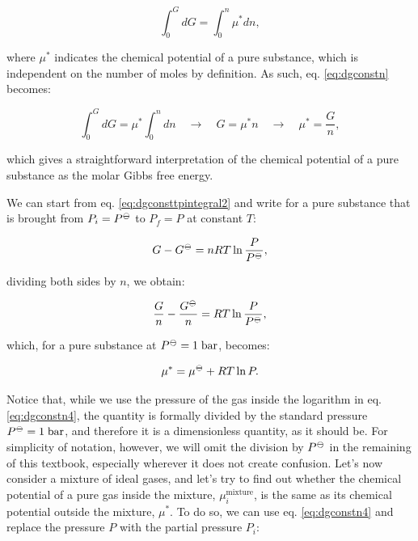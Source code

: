 \documentclass[
]{book}
\theoremstyle{definition}
\theoremstyle{definition}
\theoremstyle{definition}
\theoremstyle{remark}
\begin{document}
\begin{equation}
\int_0^G d G = \int_0^n \mu^* dn,
\label{eq:dgconstn}
\end{equation}

where \(\mu^*\) indicates the chemical potential of a pure substance, which is independent on the number of moles by definition. As such, eq. \eqref{eq:dgconstn} becomes:

\begin{equation}
\int_0^G d G = \mu^* \int_0^n dn \quad \rightarrow \quad G = \mu^* n \quad \rightarrow \quad \mu^* = \frac{G}{n},
\label{eq:dgconstn1}
\end{equation}

which gives a straightforward interpretation of the chemical potential of a pure substance as the molar Gibbs free energy.

We can start from eq. \eqref{eq:dgconsttpintegral2} and write for a pure substance that is brought from \(P_i=P^{-\kern-6pt{\ominus}\kern-6pt-}\) to \(P_f=P\) at constant \(T\):

\begin{equation}
G - G^{-\kern-6pt{\ominus}\kern-6pt-}= nRT \ln \frac{P}{P^{-\kern-6pt{\ominus}\kern-6pt-}},
\label{eq:dgconstn2}
\end{equation}

dividing both sides by \(n\), we obtain:

\begin{equation}
\frac{G}{n} - \frac{G^{-\kern-6pt{\ominus}\kern-6pt-}}{n} = RT \ln \frac{P}{P^{-\kern-6pt{\ominus}\kern-6pt-}},
\label{eq:dgconstn3}
\end{equation}

which, for a pure substance at \(P^{-\kern-6pt{\ominus}\kern-6pt-}= 1 \;\text{bar}\), becomes:

\begin{equation}
\mu^* = \mu^{-\kern-6pt{\ominus}\kern-6pt-}+ RT \ln P.
\label{eq:dgconstn4}
\end{equation}

Notice that, while we use the pressure of the gas inside the logarithm in eq. \eqref{eq:dgconstn4}, the quantity is formally divided by the standard pressure \(P^{-\kern-6pt{\ominus}\kern-6pt-}= 1 \;\text{bar}\), and therefore it is a dimensionless quantity, as it should be. For simplicity of notation, however, we will omit the division by \(P^{-\kern-6pt{\ominus}\kern-6pt-}\) in the remaining of this textbook, especially wherever it does not create confusion.
Let's now consider a mixture of ideal gases, and let's try to find out whether the chemical potential of a pure gas inside the mixture, \(\mu_i^{\text{mixture}}\), is the same as its chemical potential outside the mixture, \(\mu^*\).
To do so, we can use eq. \eqref{eq:dgconstn4} and replace the pressure \(P\) with the partial pressure \(P_i\):
\end{document}
